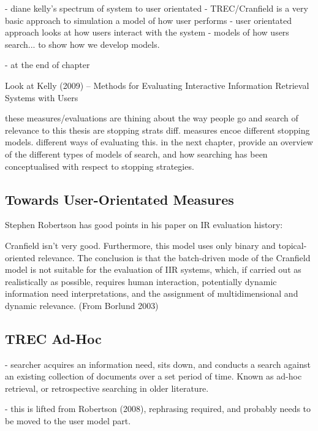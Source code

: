     - diane kelly's spectrum of system to user orientated
        - TREC/Cranfield is a very basic approach to simulation
            a model of how user performs
        - user orientated approach looks at how users interact with the system
        - models of how users search... to show how we develop models.
        
        - at the end of chapter

Look at Kelly (2009) -- Methods for Evaluating Interactive Information Retrieval Systems with Users

these measures/evaluations are thining about the way people go and search
of relevance to this thesis are stopping strats
diff. measures encoe different stopping models. different ways of evaluating this.
in the next chapter, provide an overview of the different types of models of search, and how searching has been conceptualised with respect to stopping strategies.

\subsection{Towards User-Orientated Measures}

Stephen Robertson has good points in his paper on IR evaluation history:~\cite{robertson2008history_ir_evaluation}

Cranfield isn't very good. Furthermore, this model uses only binary and topical-oriented relevance. The conclusion is that the batch-driven mode of the Cranfield model is not suitable for the evaluation of IIR systems, which, if carried out as realistically as possible, requires human interaction, potentially dynamic information need interpretations, and the assignment of multidimensional and dynamic relevance. (From Borlund 2003)


\subsection{TREC Ad-Hoc}\label{sec:ir_background:user:trec}
- searcher acquires an information need, sits down, and conducts a search against an existing collection of documents over a set period of time. Known as ad-hoc retrieval, or retrospective searching in older literature.

- this is lifted from Robertson (2008), rephrasing required, and probably needs to be moved to the user model part.

